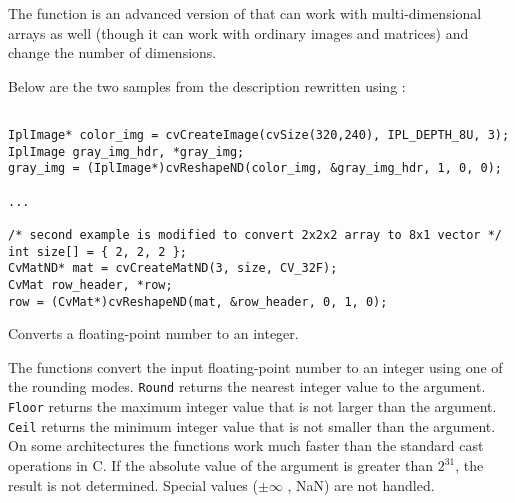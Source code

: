 \begin{description}
\ifC
{}
\else
{}
\fi
\end{description}

The function is an advanced version of  that can work with multi-dimensional arrays as well (though it can work with ordinary images and matrices) and change the number of dimensions.

\ifC
Below are the two samples from the  description rewritten using :

\begin{lstlisting}

IplImage* color_img = cvCreateImage(cvSize(320,240), IPL_DEPTH_8U, 3);
IplImage gray_img_hdr, *gray_img;
gray_img = (IplImage*)cvReshapeND(color_img, &gray_img_hdr, 1, 0, 0);

...

/* second example is modified to convert 2x2x2 array to 8x1 vector */
int size[] = { 2, 2, 2 };
CvMatND* mat = cvCreateMatND(3, size, CV_32F);
CvMat row_header, *row;
row = (CvMat*)cvReshapeND(mat, &row_header, 0, 1, 0);

\end{lstlisting}
\fi

\ifC
{}\label{cvRound}

Converts a floating-point number to an integer.


\begin{description}
\end{description}


The functions convert the input floating-point number to an integer using one of the rounding
modes. \texttt{Round} returns the nearest integer value to the
argument. \texttt{Floor} returns the maximum integer value that is not
larger than the argument. \texttt{Ceil} returns the minimum integer
value that is not smaller than the argument. On some architectures the
functions work much faster than the standard cast
operations in C. If the absolute value of the argument is greater than
$2^{31}$, the result is not determined. Special values ($\pm \infty$ , NaN)
are not handled.

